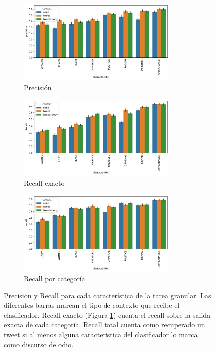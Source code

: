 \begin{figure}[ht]
    \centering
    \small
    \begin{subfigure}[b]{\textwidth}
        \centering
        \includegraphics[width=0.85\textwidth]{img/06/precision_barplot.pdf}
        \caption{Precisión}
    \end{subfigure}
    \begin{subfigure}[b]{\textwidth}
        \centering
        \includegraphics[width=0.85\textwidth]{img/06/exact_recall_barplot.pdf}
        \caption{Recall exacto}
        \label{subfig:exact_recall}
    \end{subfigure}
    \begin{subfigure}[b]{\textwidth}
        \centering
        \includegraphics[width=0.85\textwidth]{img/06/hate_recall_barplot.pdf}
        \caption{Recall por categoría}
        \label{subfig:total_recall}
    \end{subfigure}
    \caption{Precision y Recall para cada característica de la tarea granular. Las diferentes barras marcan el tipo de contexto que recibe el clasificador. Recall exacto (Figura \ref{subfig:exact_recall}) cuenta el recall sobre la salida exacta de cada categoría. Recall total cuenta como recuperado un tweet si al menos alguna característica del clasificador lo marca como discurso de odio.}
    \label{fig:precision_recall}
\end{figure}

